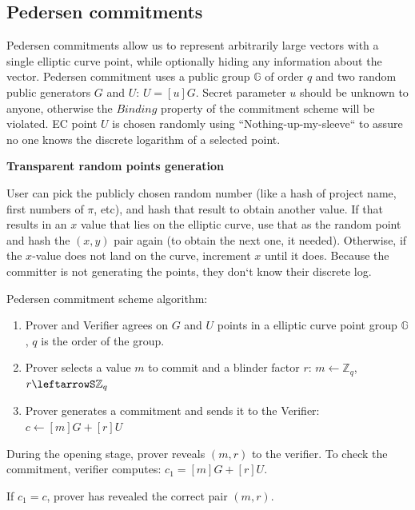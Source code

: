 \documentclass[../lecture-notes-148x210.tex]{subfiles}
\begin{document}
\subsection{Pedersen commitments}

Pedersen commitments allow us to represent arbitrarily large vectors with a single elliptic curve point, while optionally hiding any information about the vector. Pedersen commitment uses a public group $\mathbb{G}$ of order $q$ and two random public generators $G$ and $U$: $U = [u]G$. Secret parameter $u$ should be unknown to anyone, otherwise the $\textit{Binding}$ property of the commitment scheme will be violated.
EC point $U$ is chosen randomly using ``Nothing-up-my-sleeve`` to assure no one knows the discrete logarithm of a selected point.

\begin{remark}
    \textbf{Transparent random points generation}

    User can pick the publicly chosen random number (like a hash of project name, first numbers of $\pi$, etc), and hash that result to obtain another value. If that results in an $x$ value that lies on the elliptic curve, use that as the random point and hash the $(x, y)$ pair again (to obtain the next one, it needed). Otherwise, if the $x$-value does not land on the curve, increment $x$ until it does. Because the committer is not generating the points, they don`t know their discrete log. 
\end{remark}

Pedersen commitment scheme algorithm:
\begin{enumerate}
    \item Prover and Verifier agrees on $G$ and $U$ points in a elliptic curve point group $\mathbb{G}$, $q$ is the order of the group.
    \item Prover selects a value $m$ to commit and a blinder factor $r$:
            $m \leftarrow \mathbb{Z}_q$,
            $r \leftarrowS \mathbb{Z}_q$
    \item Prover generates a commitment and sends it to the Verifier:
            $c \gets [m]G + [r]U$
\end{enumerate}

During the opening stage, prover reveals $(m, r)$ to the verifier. 
To check the commitment, verifier computes: $c_1 = [m]G + [r]U$.

If $c_1 = c$, prover has revealed the correct pair $(m, r)$.
\end{document}
